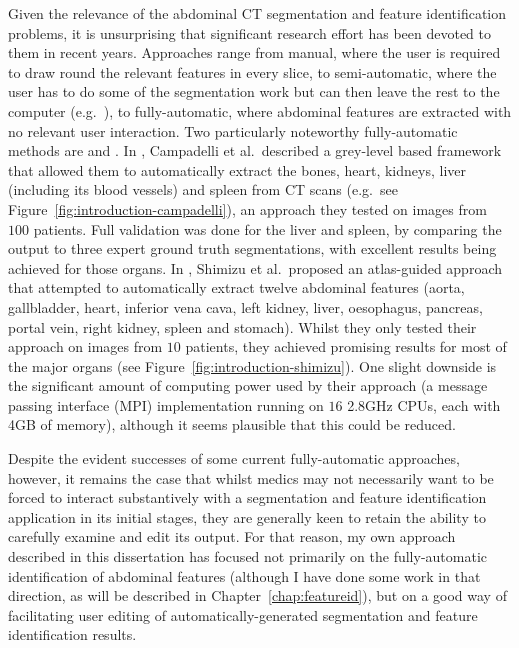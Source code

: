 Given the relevance of the abdominal CT segmentation and feature identification problems, it is unsurprising that significant research effort has been devoted to them in recent years. Approaches range from manual, where the user is required to draw round the relevant features in every slice, to semi-automatic, where the user has to do some of the segmentation work but can then leave the rest to the computer (e.g.~\cite{loncaric00}), to fully-automatic, where abdominal features are extracted with no relevant user interaction. Two particularly noteworthy fully-automatic methods are \cite{campadelli09} and \cite{shimizu07}. In \cite{campadelli09}, Campadelli et al.\ described a grey-level based framework that allowed them to automatically extract the bones, heart, kidneys, liver (including its blood vessels) and spleen from CT scans (e.g.~see Figure~\ref{fig:introduction-campadelli}), an approach they tested on images from $100$ patients. Full validation was done for the liver and spleen, by comparing the output to three expert ground truth segmentations, with excellent results being achieved for those organs. In \cite{shimizu07}, Shimizu et al.\ proposed an atlas-guided approach that attempted to automatically extract twelve abdominal features (aorta, gallbladder, heart, inferior vena cava, left kidney, liver, oesophagus, pancreas, portal vein, right kidney, spleen and stomach). Whilst they only tested their approach on images from $10$ patients, they achieved promising results for most of the major organs (see Figure~\ref{fig:introduction-shimizu}). One slight downside is the significant amount of computing power used by their approach (a message passing interface (MPI) implementation running on $16$ 2.8GHz CPUs, each with 4GB of memory), although it seems plausible that this could be reduced.


Despite the evident successes of some current fully-automatic approaches, however, it remains the case that whilst medics may not necessarily want to be forced to interact substantively with a segmentation and feature identification application in its initial stages, they are generally keen to retain the ability to carefully examine and edit its output. For that reason, my own approach described in this dissertation has focused not primarily on the fully-automatic identification of abdominal features (although I have done some work in that direction, as will be described in Chapter~\ref{chap:featureid}), but on a good way of facilitating user editing of automatically-generated segmentation and feature identification results.

